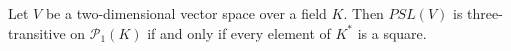 Let $V$ be a two-dimensional vector space over a field $K$. Then $PSL(V)$ is three-transitive on $\mathcal{P}_1(K)$ if and only if every element of $K^*$ is a square.

